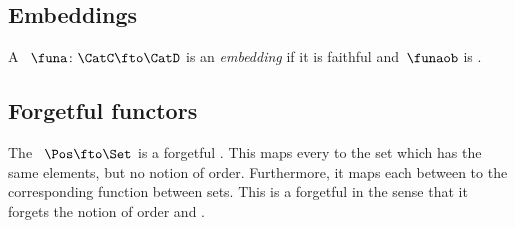 {\subsection{Embeddings}
\publictodomessage

\begin{ctdefinition}
    \label{def:embedding-functor}

    A ~$\funa\colon \CatC \fto \CatD$ is an \emph{embedding} if it is faithful and~$\funaob$ is .
\end{ctdefinition}



\subsection{Forgetful functors}
\label{sec:forgetful-functors}


\begin{example}
    The ~$\Pos \fto \Set$ is a forgetful .
    This  maps every  to the set which has the same elements, but no notion of order.
    Furthermore, it maps each  between  to the corresponding function between sets.
    This is a forgetful  in the sense that it forgets the notion of order and .
\end{example}


}

